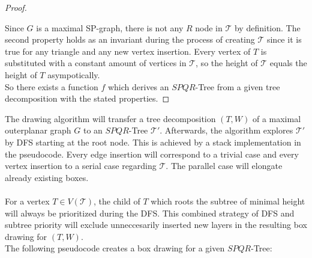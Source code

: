 \begin{proof}
\begin{description}
\begin{figure}[H]
		\end{figure}
	\end{description}
	Since $G$ is a maximal SP-graph, there is not any $R$ node in $\mathcal{T}$ by definition. The second property holds as an invariant during the process of creating $\mathcal{T}$ since it is true for any triangle and any new vertex insertion. Every vertex of $T$ is substituted with a constant amount of vertices in $\mathcal{T}$, so the height of $\mathcal{T}$ equals the height of $T$ asympotically.\\
	So there exists a function $f$ which derives an $SPQR$-Tree from a given tree decomposition with the stated properties.
\end{proof}
The drawing algorithm will transfer a tree decomposition $(T,W)$ of a maximal outerplanar graph $G$ to an $SPQR$-Tree $\mathcal{T}'$. Afterwards, the algorithm explores $\mathcal{T}'$ by DFS starting at the root node. This is achieved by a stack implementation in the pseudocode. Every edge insertion will correspond to a trivial case and every vertex insertion to a serial case regarding $\mathcal{T}$. The parallel case will elongate already existing boxes.\\\\
For a vertex $T\in V(\mathcal{T})$, the child of $T$ which roots the subtree of minimal height will always be prioritized during the DFS. This combined strategy of DFS and subtree priority will exclude unneccesarily inserted new layers in the resulting box drawing for $(T,W)$. \\
The following pseudocode creates a box drawing for a given $SPQR$-Tree:\\
